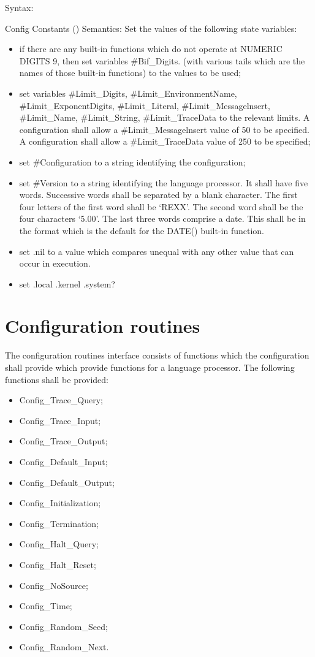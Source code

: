 Syntax:

Config Constants () Semantics: Set the values of the following state
variables:

\begin{itemize}
\item
  if there are any built-in functions which do not operate at NUMERIC
  DIGITS 9, then set variables \#Bif\_Digits. (with various tails which
  are the names of those built-in functions) to the values to be used;
\item
  set variables \#Limit\_Digits, \#Limit\_EnvironmentName,
  \#Limit\_ExponentDigits, \#Limit\_Literal, \#Limit\_Messagelnsert,
  \#Limit\_Name, \#Limit\_String, \#Limit\_TraceData to the relevant
  limits. A configuration shall allow a \#Limit\_Messagelnsert value of
  50 to be specified. A configuration shall allow a \#Limit\_TraceData
  value of 250 to be specified;
\item
  set \#Configuration to a string identifying the configuration;
\item
  set \#Version to a string identifying the language processor. It shall
  have five words. Successive words shall be separated by a blank
  character. The first four letters of the first word shall be `REXX'.
  The second word shall be the four characters `5.00'. The last three
  words comprise a date. This shall be in the format which is the
  default for the DATE() built-in function.
\item
  set .nil to a value which compares unequal with any other value that
  can occur in execution.
\item
  set .local .kernel .system?
\end{itemize}

\hypertarget{configuration-routines}{%
\section{Configuration routines}\label{configuration-routines}}

The configuration routines interface consists of functions which the
configuration shall provide which provide functions for a language
processor. The following functions shall be provided:

\begin{itemize}
\item
  Config\_Trace\_Query;
\item
  Config\_Trace\_Input;
\item
  Config\_Trace\_Output;
\item
  Config\_Default\_Input;
\item
  Config\_Default\_Output;
\item
  Config\_Initialization;
\item
  Config\_Termination;
\item
  Config\_Halt\_Query;
\item
  Config\_Halt\_Reset;
\item
  Config\_NoSource;
\item
  Config\_Time;
\item
  Config\_Random\_Seed;
\item
  Config\_Random\_Next.
\end{itemize}

